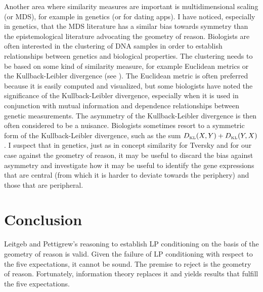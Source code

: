 \documentclass[11pt]{article}
\begin{document}
Another area where similarity measures are important is
multidimensional scaling (or MDS), for example in genetics (or for
dating apps). I have noticed, especially in genetics, that the MDS
literature has a similar bias towards symmetry than the
epistemological literature advocating the geometry of reason.
Biologists are often interested in the clustering of DNA samples in
order to establish relationships between genetics and biological
properties. The clustering needs to be based on some kind of
similarity measure, for example Euclidean metrics or the
Kullback-Leibler divergence (see ). The
Euclidean metric is often preferred because it is easily computed and
visualized, but some biologists have noted the significance of the
Kullback-Leibler divergence, especially when it is used in conjunction
with mutual information and dependence relationships between genetic
measurements. The asymmetry of the Kullback-Leibler divergence is then
often considered to be a nuisance. Biologists sometimes resort to a
symmetric form of the Kullback-Leibler divergence, such as the sum
$D_{\mbox{\tiny KL}}(X,Y)+D_{\mbox{\tiny KL}}(Y,X)$. I suspect that in
genetics, just as in concept similarity for Tversky and for our case
against the geometry of reason, it may be useful to discard the bias
against asymmetry and investigate how it may be useful to identify the
gene expressions that are central (from which it is harder to deviate
towards the periphery) and those that are peripheral.

\section{Conclusion}
\label{ascc}

Leitgeb and Pettigrew's reasoning to establish LP conditioning on the
basis of the geometry of reason is valid. Given the failure of LP
conditioning with respect to the five expectations, it cannot be
sound. The premise to reject is the geometry of reason. Fortunately,
information theory replaces it and yields results that fulfill the
five expectations.
\end{document}
